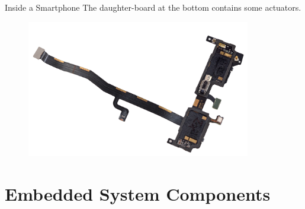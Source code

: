 \documentclass[aspectratio=169]{beamer}
\begin{document}
	\begin{frame}{Inside a Smartphone}
		The daughter-board at the bottom contains some actuators.
		\begin{figure}[b]
		\centering
		\includegraphics[width=\textwidth,height=6cm,keepaspectratio]{img/wdnGHA1UB3lBpZIL_small.png}
		\end{figure}
	\end{frame}    



\section{Embedded System Components}	
\end{document}
